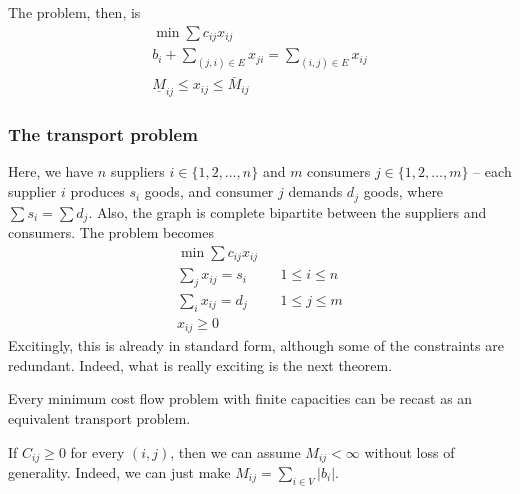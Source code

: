 \documentclass{../template/note}
\begin{document}
    The problem, then, is
    \begin{align*}
        \min \sum c_{ij}x_{ij} \\
        b_i + \sum_{(j, i) \in E} x_{ji} = \sum_{(i, j) \in E} x_{ij} \\
        \underline M_{ij} \leq x_{ij} \leq \bar M_{ij}
    \end{align*}
    
    \subsubsection{The transport problem}

    Here, we have $n$ suppliers $i \in \{1, 2, \dots, n\}$ and $m$ consumers $j \in \{1, 2, \dots, m\}$ -- each supplier $i$ produces $s_i$ goods, and consumer $j$ demands $d_j$ goods, where $\sum s_i = \sum d_j$. Also, the graph is complete bipartite between the suppliers and consumers. The problem becomes
    \begin{align*}
        \min \sum c_{ij}x_{ij} \\
        \sum_j x_{ij} = s_i && 1 \leq i \leq n \\
        \sum_i x_{ij} = d_j && 1 \leq j \leq m \\
        x_{ij} \geq 0
    \end{align*}
    Excitingly, this is already in standard form, although some of the constraints are redundant. Indeed, what is really exciting is the next theorem.

    \begin{theorem}
        Every minimum cost flow problem with finite capacities can be recast as an equivalent transport problem.
    \end{theorem}
    
    \begin{remark*}
        If $C_{ij} \geq 0$ for every $(i, j)$, then we can assume $M_{ij} < \infty$ without loss of generality. Indeed, we can just make $M_{ij} = \sum_{i \in V} |b_i|$.
    \end{remark*}
    
\end{document}
